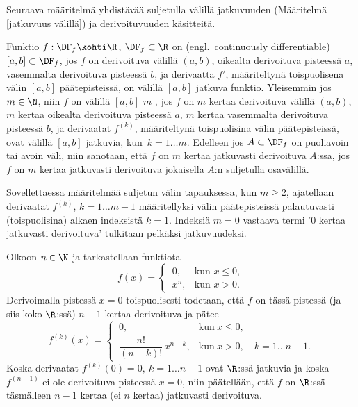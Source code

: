 Seuraava määritelmä yhdistävää suljetulla välillä jatkuvuuden 
(Määritelmä \ref{jatkuvuus välillä}) ja derivoituvuuden käsitteitä.
\begin{Def} \label{sileys}
 
Funktio $f:\DF_f\kohti\R$, $\DF_f\subset\R$ on  
(engl.\ continuously differentiable)  $[a,b]\subset\DF_f$, jos $f$ on
derivoituva välillä $(a,b)$, oikealta derivoituva pisteessä $a$, vasemmalta derivoituva 
pisteessä $b$, ja derivaatta $f'$, määriteltynä toispuolisena välin $[a,b]$ päätepisteissä, on
välillä $[a,b]$ jatkuva funktio. Yleisemmin jos $m\in\N$, niin $f$ on välillä $[a,b]$ $m$ 
, jos $f$ on $m$ kertaa derivoituva välillä $(a,b)$, $m$ 
kertaa oikealta derivoituva pisteessä $a$, $m$ kertaa vasemmalta derivoituva pisteessä $b$, ja
derivaatat $f^{(k)}$, määriteltynä toispuolisina välin päätepisteissä, ovat välillä $[a,b]$
jatkuvia, kun $\,k=1 \ldots m$. Edelleen jos $A\subset\DF_f$ on puoliavoin tai avoin väli,
niin sanotaan, että $f$ on $m$ kertaa jatkuvasti derivoituva $A$:ssa, jos $f$ on $m$ kertaa
jatkuvasti derivoituva jokaisella $A$:n suljetulla osavälillä. 
\end{Def}
Sovellettaessa määritelmää suljetun välin tapauksessa, kun $m \ge2$, ajatellaan derivaatat
$f^{(k)}$, $k=1\ldots m-1$ määritellyksi välin päätepisteissä palautuvasti (toispuolisina)
alkaen indeksistä $k=1$. Indeksiä $m=0$ vastaava termi '$0$ kertaa jatkuvasti derivoituva'
tulkitaan pelkäksi jatkuvuudeksi. 
\begin{Exa} \label{sileysesimerkki} Olkoon $n\in\N$ ja tarkastellaan funktiota
\[
f(x) = \begin{cases} \,0, &\text{kun } x\leq 0, \\ \,x^n, &\text{kun } x>0. \end{cases}
\]
Derivoimalla pistessä $x=0$ toispuolisesti todetaan, että $f$ on tässä pistessä (ja siis koko
$\R$:ssä) $n-1$ kertaa derivoituva ja pätee
\[
f^{(k)}(x) = \begin{cases}
             \,0,                           &\text{kun}\ x \le 0, \\[2mm]
             \,\dfrac{n!}{(n-k)!}\,x^{n-k}, &\text{kun}\ x>0, \quad k=1 \ldots n-1.
             \end{cases}
\]
Koska derivaatat $f^{(k)}(0)=0,\ k=1 \ldots n-1$ ovat $\R$:ssä jatkuvia ja koska $f^{(n-1)}$ 
ei ole derivoituva pisteessä $x=0$, niin päätellään, että $f$ on $\R$:ssä täsmälleen $n-1$
kertaa (ei $n$ kertaa) jatkuvasti derivoituva. \loppu
\end{Exa}
